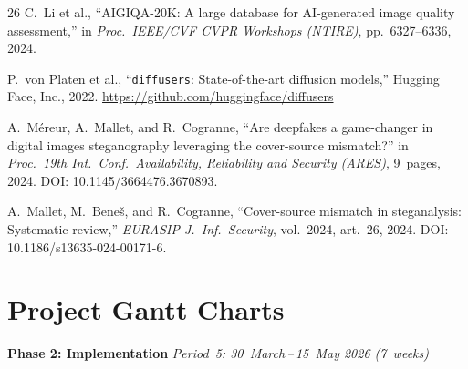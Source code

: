 \documentclass[10pt,twocolumn,a4paper]{article}
\begin{document}
\begin{thebibliography}{26}
C.~Li et al.,
``AIGIQA-20K: A large database for AI-generated image quality assessment,''
in \textit{Proc.\ IEEE/CVF CVPR Workshops (NTIRE)}, pp.~6327--6336, 2024.

P.~von Platen et al.,
``\texttt{diffusers}: State-of-the-art diffusion models,''
Hugging Face, Inc., 2022.
\url{https://github.com/huggingface/diffusers}

A.~M\'{e}reur, A.~Mallet, and R.~Cogranne,
``Are deepfakes a game-changer in digital images steganography leveraging the cover-source mismatch?''
in \textit{Proc.\ 19th Int.\ Conf.\ Availability, Reliability and Security (ARES)}, 9~pages, 2024.
DOI: 10.1145/3664476.3670893.

A.~Mallet, M.~Bene\v{s}, and R.~Cogranne,
``Cover-source mismatch in steganalysis: Systematic review,''
\textit{EURASIP J.\ Inf.\ Security}, vol.~2024, art.~26, 2024.
DOI: 10.1186/s13635-024-00171-6.

\end{thebibliography}

\clearpage
\onecolumn
\appendix

\section{Project Gantt Charts}
\label{app:gantt}


\noindent\textbf{\large Phase 2: Implementation} \hfill
\textit{Period~5: 30~March\,--\,15~May 2026 (7~weeks)}

\vspace{6pt}
\end{document}
